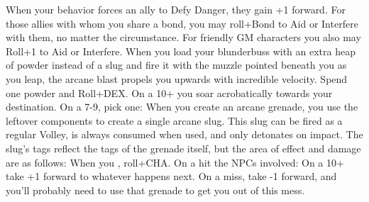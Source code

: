 \documentclass[darkmode]{dw_playbook}
\begin{document}
\pageThree
    {
        \advancedMovesCont
    }
    {
            {
            When your behavior forces an ally to Defy Danger, they gain +1 forward.  For those allies with whom you share a bond, you may roll+Bond to Aid or Interfere with them, no matter the circumstance.  For friendly GM characters you also may Roll+1 to Aid or Interfere.}
        \gap
            {
            When you load your blunderbuss with an extra heap of powder instead of a slug and fire it with the muzzle pointed beneath you as you leap, the arcane blast propels you upwards with incredible velocity.  Spend one powder and Roll+DEX.  On a 10+ you soar acrobatically towards your destination.  On a 7-9, pick one:
            \gapSm
            \gapSm
            }
        \gap
            {When you create an arcane grenade, you use the leftover components to create a single arcane slug.  This slug can be fired as a regular Volley, is always consumed when used, and only detonates on impact.  The slug’s tags reflect the tags of the grenade itself, but the area of effect and damage are as follows:
            \gapSm
            \gapSm
            \gapSm
            \gapSm
            \gapSm
            \gapSm
            }
            {When you , roll+CHA.  On a hit the NPCs involved:
            \gapSm
            \gapSm
            \gapSm
            \gap
            On a 10+ take +1 forward to whatever happens next.  On a miss, take -1 forward, and you’ll probably need to use that grenade to get you out of this mess.}
}
\end{document}
